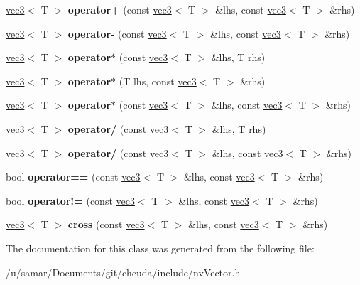 \begin{DoxyCompactItemize}
\hyperlink{classnv_1_1vec3}{vec3}$<$ T $>$ {\bfseries operator+} (const \hyperlink{classnv_1_1vec3}{vec3}$<$ T $>$ \&lhs, const \hyperlink{classnv_1_1vec3}{vec3}$<$ T $>$ \&rhs)
\item 
\hypertarget{classnv_1_1vec3_af78147fab28f9a3a8c9edf28986e27da}{}\label{classnv_1_1vec3_af78147fab28f9a3a8c9edf28986e27da} 
\hyperlink{classnv_1_1vec3}{vec3}$<$ T $>$ {\bfseries operator-\/} (const \hyperlink{classnv_1_1vec3}{vec3}$<$ T $>$ \&lhs, const \hyperlink{classnv_1_1vec3}{vec3}$<$ T $>$ \&rhs)
\item 
\hypertarget{classnv_1_1vec3_a1a68fca99ee9a6ba467baf36d9b477dd}{}\label{classnv_1_1vec3_a1a68fca99ee9a6ba467baf36d9b477dd} 
\hyperlink{classnv_1_1vec3}{vec3}$<$ T $>$ {\bfseries operator$\ast$} (const \hyperlink{classnv_1_1vec3}{vec3}$<$ T $>$ \&lhs, T rhs)
\item 
\hypertarget{classnv_1_1vec3_a1abb03b326653c94eedbff6b967a0fa8}{}\label{classnv_1_1vec3_a1abb03b326653c94eedbff6b967a0fa8} 
\hyperlink{classnv_1_1vec3}{vec3}$<$ T $>$ {\bfseries operator$\ast$} (T lhs, const \hyperlink{classnv_1_1vec3}{vec3}$<$ T $>$ \&rhs)
\item 
\hypertarget{classnv_1_1vec3_ab0365df5a4a15bca5aa86f13f0642d33}{}\label{classnv_1_1vec3_ab0365df5a4a15bca5aa86f13f0642d33} 
\hyperlink{classnv_1_1vec3}{vec3}$<$ T $>$ {\bfseries operator$\ast$} (const \hyperlink{classnv_1_1vec3}{vec3}$<$ T $>$ \&lhs, const \hyperlink{classnv_1_1vec3}{vec3}$<$ T $>$ \&rhs)
\item 
\hypertarget{classnv_1_1vec3_a7871a19554011d56a1e97822e1eaf340}{}\label{classnv_1_1vec3_a7871a19554011d56a1e97822e1eaf340} 
\hyperlink{classnv_1_1vec3}{vec3}$<$ T $>$ {\bfseries operator/} (const \hyperlink{classnv_1_1vec3}{vec3}$<$ T $>$ \&lhs, T rhs)
\item 
\hypertarget{classnv_1_1vec3_a81ffa1ef5723fd3e1592fe13eaa79728}{}\label{classnv_1_1vec3_a81ffa1ef5723fd3e1592fe13eaa79728} 
\hyperlink{classnv_1_1vec3}{vec3}$<$ T $>$ {\bfseries operator/} (const \hyperlink{classnv_1_1vec3}{vec3}$<$ T $>$ \&lhs, const \hyperlink{classnv_1_1vec3}{vec3}$<$ T $>$ \&rhs)
\item 
\hypertarget{classnv_1_1vec3_a0cada26488c14237f5e3cad4bcf16ab9}{}\label{classnv_1_1vec3_a0cada26488c14237f5e3cad4bcf16ab9} 
bool {\bfseries operator==} (const \hyperlink{classnv_1_1vec3}{vec3}$<$ T $>$ \&lhs, const \hyperlink{classnv_1_1vec3}{vec3}$<$ T $>$ \&rhs)
\item 
\hypertarget{classnv_1_1vec3_acd3e3772974abccec731c328931e1aa7}{}\label{classnv_1_1vec3_acd3e3772974abccec731c328931e1aa7} 
bool {\bfseries operator!=} (const \hyperlink{classnv_1_1vec3}{vec3}$<$ T $>$ \&lhs, const \hyperlink{classnv_1_1vec3}{vec3}$<$ T $>$ \&rhs)
\item 
\hypertarget{classnv_1_1vec3_a82d0fe479389dc0f4c0e51f504427f56}{}\label{classnv_1_1vec3_a82d0fe479389dc0f4c0e51f504427f56} 
\hyperlink{classnv_1_1vec3}{vec3}$<$ T $>$ {\bfseries cross} (const \hyperlink{classnv_1_1vec3}{vec3}$<$ T $>$ \&lhs, const \hyperlink{classnv_1_1vec3}{vec3}$<$ T $>$ \&rhs)
\end{DoxyCompactItemize}


The documentation for this class was generated from the following file\+:\begin{DoxyCompactItemize}
\item 
/u/samar/\+Documents/git/chcuda/include/nv\+Vector.\+h\end{DoxyCompactItemize}
